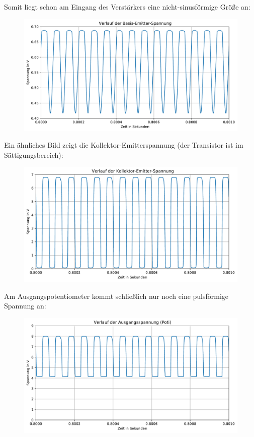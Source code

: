 Somit liegt schon am Eingang des Verstärkers eine nicht-sinusförmige Größe an:

\begin{figure}[H]
    \centering
    \includegraphics[width = \textwidth]{tex/1_Microphone/pictures/BaseEmitterVoltage.pdf}
    \label{fig:my_label}
\end{figure}

Ein ähnliches Bild zeigt die Kollektor-Emitterspannung (der Transistor ist im Sättigungsbereich):

\begin{figure}[H]
    \centering
    \includegraphics[width = \textwidth]{tex/1_Microphone/pictures/CollectorEmitterVoltage.pdf}
    \label{fig:my_label}
\end{figure}

Am Ausgangspotentiometer kommt schließlich nur noch eine pulsförmige Spannung an: 

\begin{figure}[H]
    \centering
    \includegraphics[width = \textwidth]{tex/1_Microphone/pictures/outputvoltage.pdf}
    \label{fig:my_label}
\end{figure}

